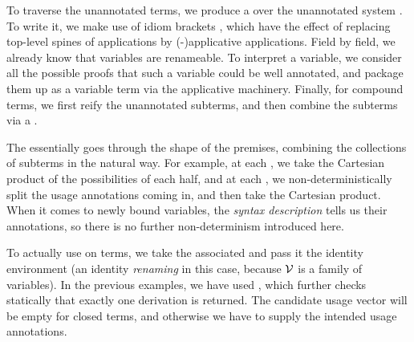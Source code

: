 
To traverse the unannotated terms, we produce a  over the
unannotated system \AgdaSpace{}.
To write it, we make use of idiom brackets
\AgdaSymbol{(|}\AgdaSpace{}\AgdaSymbol{$\ldots$}\AgdaSpace{}\AgdaSymbol{|)},
which have the effect of replacing top-level spines of applications by
(-)applicative applications.
Field by field, we already know that variables are renameable.
To interpret a variable, we consider all the possible proofs that such a
variable could be well annotated, and package them up as a variable term via
the applicative machinery.
Finally, for compound terms, we first reify the unannotated subterms, and then
combine the subterms via a .


The  essentially goes through the shape of the premises,
combining the collections of subterms in the natural way.
For example, at each
\AgdaInductiveConstructor{\AgdaUnderscore{}$\dottimes$\AgdaUnderscore{}},
we take the Cartesian product of the possibilities of each half, and at each
\AgdaInductiveConstructor{\AgdaUnderscore{}$\sep$\AgdaUnderscore{}},
we non-deterministically split the usage annotations coming in, and then take
the Cartesian product.
When it comes to newly bound variables, the \emph{syntax description} tells us
their annotations, so there is no further non-determinism introduced here.


To actually use  on terms, we take the associated
 and pass it the identity environment (an identity
\emph{renaming} in this case, because $\mathcal V$ is a family of variables).
In the previous examples, we have used , which further
checks statically that exactly one derivation is returned.
The candidate usage vector  will be empty for closed terms, and
otherwise we have to supply the intended usage annotations.
